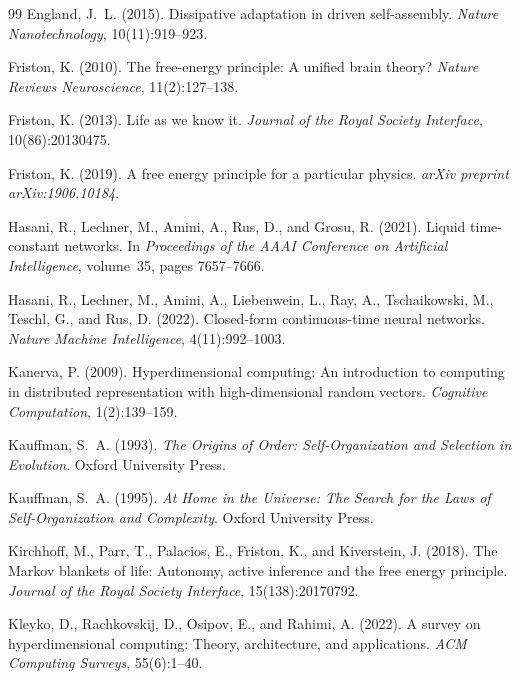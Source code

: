 \documentclass[12pt,a4paper]{article}
\begin{document}
\begin{thebibliography}{99}
England, J.~L. (2015).
\newblock Dissipative adaptation in driven self-assembly.
\newblock \emph{Nature Nanotechnology}, 10(11):919--923.

Friston, K. (2010).
\newblock The free-energy principle: A unified brain theory?
\newblock \emph{Nature Reviews Neuroscience}, 11(2):127--138.

Friston, K. (2013).
\newblock Life as we know it.
\newblock \emph{Journal of the Royal Society Interface},
  10(86):20130475.

Friston, K. (2019).
\newblock A free energy principle for a particular physics.
\newblock \emph{arXiv preprint arXiv:1906.10184}.

Hasani, R., Lechner, M., Amini, A., Rus, D., and Grosu, R. (2021).
\newblock Liquid time-constant networks.
\newblock In \emph{Proceedings of the AAAI Conference on Artificial
  Intelligence}, volume~35, pages 7657--7666.

Hasani, R., Lechner, M., Amini, A., Liebenwein, L., Ray, A., Tschaikowski,
  M., Teschl, G., and Rus, D. (2022).
\newblock Closed-form continuous-time neural networks.
\newblock \emph{Nature Machine Intelligence}, 4(11):992--1003.

Kanerva, P. (2009).
\newblock Hyperdimensional computing: An introduction to computing in
  distributed representation with high-dimensional random vectors.
\newblock \emph{Cognitive Computation}, 1(2):139--159.

Kauffman, S.~A. (1993).
\newblock \emph{The Origins of Order: Self-Organization and Selection in
  Evolution}.
\newblock Oxford University Press.

Kauffman, S.~A. (1995).
\newblock \emph{At Home in the Universe: The Search for the Laws of
  Self-Organization and Complexity}.
\newblock Oxford University Press.

Kirchhoff, M., Parr, T., Palacios, E., Friston, K., and Kiverstein, J.
  (2018).
\newblock The Markov blankets of life: Autonomy, active inference and the
  free energy principle.
\newblock \emph{Journal of the Royal Society Interface},
  15(138):20170792.

Kleyko, D., Rachkovskij, D., Osipov, E., and Rahimi, A. (2022).
\newblock A survey on hyperdimensional computing: Theory, architecture,
  and applications.
\newblock \emph{ACM Computing Surveys}, 55(6):1--40.


\end{thebibliography}
\end{document}
